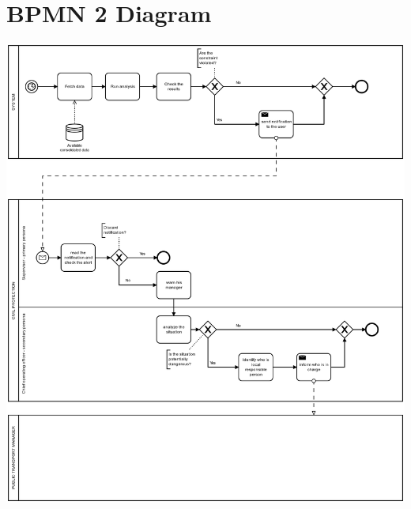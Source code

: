 \documentclass[../main.tex]{subfiles}
\begin{document}
    \section{BPMN 2 Diagram}\label{sec:bpmn-2-diagram}
    \includegraphics[scale = 0.45]{assets/bpmn2.png}
\end{document}
